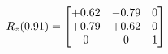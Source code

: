 \documentclass[preview]{standalone}
\begin{document}
\begin{align*}
\special{dvisvgm:raw <g id='unique000'>}R_{z}(0.91) = \begin{bmatrix}+0.62 & -0.79 & 0 \\+0.79 & +0.62 & 0 \\0 & 0 & 1\end{bmatrix}\special{dvisvgm:raw </g>}
\end{align*}
\end{document}

